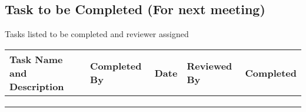 \documentclass{article}
\begin{document}
\subsection{Task to be Completed (For next meeting) }
Tasks listed to be completed and reviewer assigned
\begin{center}
    \begin{tabular}{|p{9cm}|l|l|l|l|}
    \hline
    Task Name and Description & Completed By & Date & Reviewed By & Completed \\ \hline
                              &              &      &             &           \\ \hline
                              &              &      &             &           \\ \hline
                              &              &      &             &           \\ \hline
    \end{tabular}
    \end{center}
\end{document}
